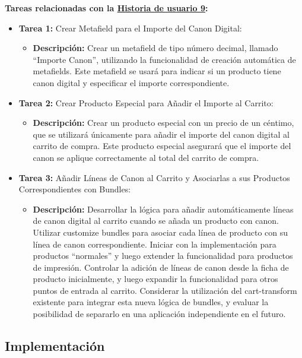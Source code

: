 \documentclass[12pt]{article}
\begin{document}
\textbf{Tareas relacionadas con la \hyperref[sec:historia9]{Historia de usuario 9}:}
\begin{itemize}
    \item \textbf{Tarea 1:} Crear Metafield para el Importe del Canon Digital:
          \begin{itemize}[label=--]
              \item \textbf{Descripción:} Crear un metafield de tipo número decimal, llamado ``Importe Canon'', utilizando la funcionalidad de creación automática de metafields. Este metafield se usará para indicar si un producto tiene canon digital y especificar el importe correspondiente.
          \end{itemize}
    \item \textbf{Tarea 2:} Crear Producto Especial para Añadir el Importe al Carrito:
          \begin{itemize}[label=--]
              \item \textbf{Descripción:} Crear un producto especial con un precio de un céntimo, que se utilizará únicamente para añadir el importe del canon digital al carrito de compra. Este producto especial asegurará que el importe del canon se aplique correctamente al total del carrito de compra.
          \end{itemize}
    \item \textbf{Tarea 3:} Añadir Líneas de Canon al Carrito y Asociarlas a sus Productos Correspondientes con Bundles:
          \begin{itemize}[label=--]
              \item \textbf{Descripción:} Desarrollar la lógica para añadir automáticamente líneas de canon digital al carrito cuando se añada un producto con canon. Utilizar customize bundles para asociar cada línea de producto con su línea de canon correspondiente.
              Iniciar con la implementación para productos ``normales'' y luego extender la funcionalidad para productos de impresión.
              Controlar la adición de líneas de canon desde la ficha de producto inicialmente, y luego expandir la funcionalidad para otros puntos de entrada al carrito.
              Considerar la utilización del cart-transform existente para integrar esta nueva lógica de bundles, y evaluar la posibilidad de separarlo en una aplicación independiente en el futuro.
          \end{itemize}
\end{itemize}


\subsection{Implementación}
\end{document}

